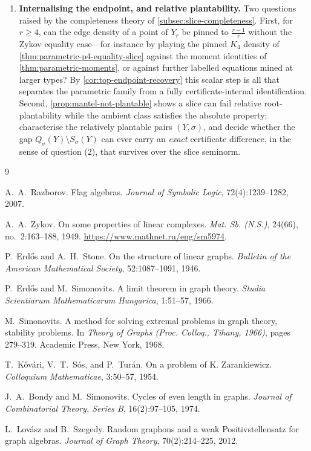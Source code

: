 \documentclass[11pt]{article}
\theoremstyle{definition}
\begin{document}
\begin{enumerate}[label=\textup{(\arabic*)}, leftmargin=2.8em]
  \item \textbf{Internalising the endpoint, and relative plantability.}
  Two questions raised by the completeness theory of
  \cref{subsec:slice-completeness}.  First, for $r\ge4$, can the edge density of a
  point of $Y_r$ be pinned to $\frac{r-1}r$ without the Zykov equality case---for
  instance by playing the pinned $K_4$ density of
  \cref{thm:parametric-p4-equality-slice} against the moment identities of
  \cref{thm:parametric-moments}, or against further labelled equations mined at larger
  types?  By \cref{cor:top-endpoint-recovery} this scalar step is all that separates
  the parametric family from a fully certificate-internal identification.  Second,
  \cref{prop:mantel-not-plantable} shows a slice can fail relative root-plantability
  while the ambient class satisfies the absolute property; characterise the relatively
  plantable pairs $(Y,\sigma)$, and decide whether the gap
  $Q_\sigma(Y)\setminus S_\sigma(Y)$ can ever carry an \emph{exact} certificate
  difference, in the sense of question (2), that survives over the slice seminorm.
\end{enumerate}

\begin{thebibliography}{9}

A.~A.~Razborov.
\newblock Flag algebras.
\newblock \emph{Journal of Symbolic Logic}, 72(4):1239--1282, 2007.

A.~A.~Zykov.
\newblock On some properties of linear complexes.
\newblock \emph{Mat. Sb. (N.S.)}, 24(66), no.~2:163--188, 1949.
\newblock \url{https://www.mathnet.ru/eng/sm5974}.

P.~Erd\H{o}s and A.~H.~Stone.
\newblock On the structure of linear graphs.
\newblock \emph{Bulletin of the American Mathematical Society}, 52:1087--1091, 1946.

P.~Erd\H{o}s and M.~Simonovits.
\newblock A limit theorem in graph theory.
\newblock \emph{Studia Scientiarum Mathematicarum Hungarica}, 1:51--57, 1966.

M.~Simonovits.
\newblock A method for solving extremal problems in graph theory, stability problems.
\newblock In \emph{Theory of Graphs (Proc. Colloq., Tihany, 1966)}, pages 279--319.
\newblock Academic Press, New York, 1968.

T.~K\H{o}v\'ari, V.~T.~S\'os, and P.~Tur\'an.
\newblock On a problem of K. Zarankiewicz.
\newblock \emph{Colloquium Mathematicae}, 3:50--57, 1954.

J.~A.~Bondy and M.~Simonovits.
\newblock Cycles of even length in graphs.
\newblock \emph{Journal of Combinatorial Theory, Series B}, 16(2):97--105, 1974.

L.~Lov\'asz and B.~Szegedy.
\newblock Random graphons and a weak Positivstellensatz for graph algebras.
\newblock \emph{Journal of Graph Theory}, 70(2):214--225, 2012.

\end{thebibliography}
\end{document}
